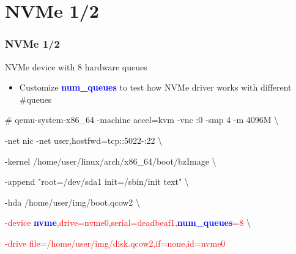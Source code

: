 \documentclass[aspectratio=169]{beamer}
\begin{document}
\section{NVMe 1/2}
\begin{frame}
\frametitle{NVMe 1/2}
{\LARGE NVMe device with 8 hardware queues}
\begin{itemize}
\item {\large Customize \textbf{\textcolor{blue}{num\_queues}} to test how NVMe driver works with different \#queues}
\end{itemize}
\begin{block}{}

\# qemu-system-x86\_64 -machine accel=kvm -vnc :0 -smp 4 -m 4096M \textbackslash

-net nic -net user,hostfwd=tcp::5022-:22 \textbackslash

-kernel /home/user/linux/arch/x86\_64/boot/bzImage \textbackslash
	
-append "root=/dev/sda1 init=/sbin/init text" \textbackslash

-hda /home/user/img/boot.qcow2 \textbackslash

\textcolor{red}{-device \textbf{\textcolor{blue}{nvme}},drive=nvme0,serial=deadbeaf1,\textbf{\textcolor{blue}{num\_queues}}=8} \textbackslash

\textcolor{red}{-drive file=/home/user/img/disk.qcow2,if=none,id=nvme0}

\end{block}
\end{frame}

\end{document}
